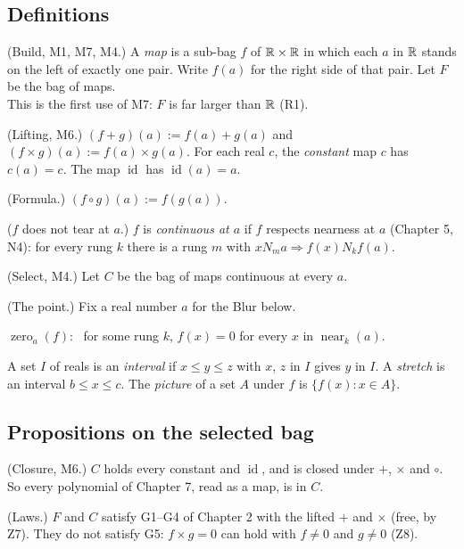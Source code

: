 \subsection*{Definitions}

\begin{lines}
\item[\lab{D1}] (Build, M1, M7, M4.) A \emph{map} is a sub-bag $f$ of $\mathbb{R} \times \mathbb{R}$ in which each $a$ in $\mathbb{R}$ stands on the left of exactly one pair. Write $f(a)$ for the right side of that pair. Let $F$ be the bag of maps. \\
This is the first use of M7: $F$ is far larger than $\mathbb{R}$ (R1).
\item[\lab{D2}] (Lifting, M6.) $(f + g)(a) := f(a) + g(a)$ and $(f \times g)(a) := f(a) \times g(a)$. For each real $c$, the \emph{constant} map $c$ has $c(a) = c$. The map $\operatorname{id}$ has $\operatorname{id}(a) = a$.
\item[\lab{D3}] (Formula.) $(f \circ g)(a) := f(g(a))$.
\item[\lab{D4}] ($f$ does not tear at $a$.) $f$ is \emph{continuous at $a$} if $f$ respects nearness at $a$ (Chapter 5, N4): for every rung $k$ there is a rung $m$ with $x \mathrel{N_m} a \Rightarrow f(x) \mathrel{N_k} f(a)$.
\item[\lab{D5}] (Select, M4.) Let $C$ be the bag of maps continuous at every $a$.
\item[\lab{D6}] (The point.) Fix a real number $a$ for the Blur below.
\item[\lab{D7}] $\operatorname{zero}_a(f)$: \ for some rung $k$, $f(x) = 0$ for every $x$ in $\operatorname{near}_k(a)$.
\item[\lab{D8}] A set $I$ of reals is an \emph{interval} if $x \le y \le z$ with $x$, $z$ in $I$ gives $y$ in $I$. A \emph{stretch} is an interval $b \le x \le c$. The \emph{picture} of a set $A$ under $f$ is $\{f(x) : x \in A\}$.
\end{lines}

\subsection*{Propositions on the selected bag}

\begin{lines}
\item[\lab{P1}] (Closure, M6.) $C$ holds every constant and $\operatorname{id}$, and is closed under $+$, $\times$ and $\circ$. So every polynomial of Chapter 7, read as a map, is in $C$.
\item[\lab{P2}] (Laws.) $F$ and $C$ satisfy G1--G4 of Chapter 2 with the lifted $+$ and $\times$ (free, by Z7). They do not satisfy G5: $f \times g = 0$ can hold with $f \neq 0$ and $g \neq 0$ (Z8).
\end{lines}

